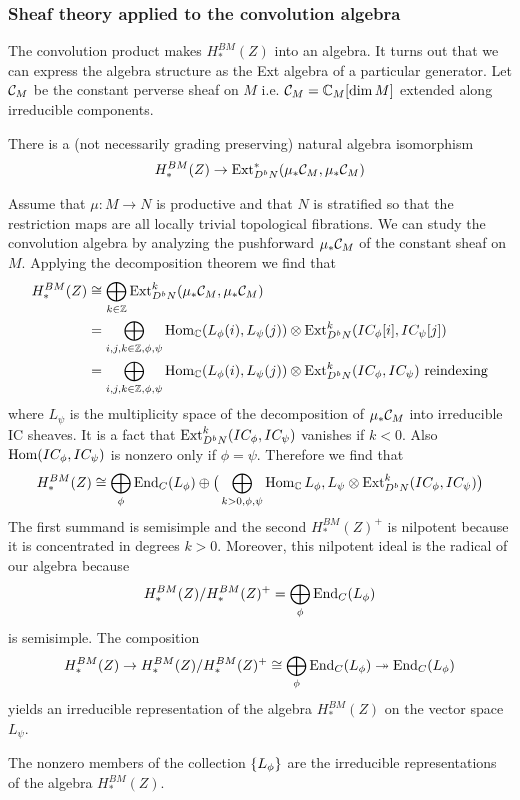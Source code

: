 \documentclass[12pt]{article}
\begin{document}
\subsubsection{Sheaf theory applied to the convolution algebra}
The convolution product makes $H^{BM}_*(Z)$ into an algebra.
It turns out that we can express the algebra structure as
the Ext algebra of a particular generator. Let ${\mathcal{C}}_M$ be the constant
perverse sheaf on $M$ i.e. ${\mathcal{C}}_M = \mathbb{C}_M[\dim M]$ extended along irreducible
components.

\begin{proposition}
    There is a (not necessarily grading preserving) natural algebra
    isomorphism \begin{align*}
        H^{BM}_*(Z) \to \operatorname{Ext}^*_{D^bN}(\mu_*{\mathcal{C}}_M,\mu_*{\mathcal{C}}_M)
    \end{align*}
\end{proposition}

Assume that $\mu:M\to N$ is productive and that $N$ is stratified
so that the restriction maps are all locally trivial topological fibrations.
We can study the convolution algebra by analyzing the pushforward
$\mu_*{\mathcal{C}}_M$ of the constant sheaf on $M$. Applying the
decomposition theorem we find that \begin{align*}
    H^{BM}_*(Z) & \cong \bigoplus_{k\in \mathbb{Z}} \operatorname{Ext}^k_{D^bN}(\mu_*{\mathcal{C}}_M,\mu_*{\mathcal{C}}_M)                                                           \\
                & = \bigoplus_{i,j,k\in\mathbb{Z},\phi,\psi} \operatorname{Hom}_{\mathbb{C}}(L_\phi(i),L_\psi(j))\otimes \operatorname{Ext}^k_{D^bN}(IC_\phi[i],IC_\psi[j])              \\
                & = \bigoplus_{i,j,k\in\mathbb{Z},\phi,\psi} \operatorname{Hom}_{\mathbb{C}}(L_\phi(i),L_\psi(j))\otimes \operatorname{Ext}^k_{D^bN}(IC_\phi,IC_\psi) \text{ reindexing}
\end{align*}
where $L_\psi$ is the multiplicity space of the decomposition of $\mu_*{\mathcal{C}}_M$ into irreducible
IC sheaves. It is a fact that $\operatorname{Ext}^k_{D^bN}(IC_\phi,IC_\psi)$ vanishes if $k<0$.
Also $\operatorname{Hom}(IC_\phi,IC_\psi)$ is nonzero only if $\phi = \psi$. Therefore
we find that \begin{align*}
    H^{BM}_*(Z) \cong \bigoplus_\phi \operatorname{End}_C(L_\phi) \oplus \big(\bigoplus_{k>0,\phi,\psi} \operatorname{Hom}_{\mathbb{C}}{L_\phi,L_\psi}\otimes
    \operatorname{Ext}^k_{D^bN}(IC_\phi,IC_\psi)\big)
\end{align*} The first summand is semisimple and the second $H^{BM}_*(Z)^+$ is nilpotent because
it is concentrated in degrees $k>0$. Moreover, this nilpotent ideal is the radical
of our algebra because
\begin{align*}
    H^{BM}_*(Z) / H^{BM}_*(Z)^+ = \bigoplus_\phi \operatorname{End}_C(L_\phi)
\end{align*} is semisimple. The composition \begin{align*}
    H^{BM}_*(Z) \to H^{BM}_*(Z) / H^{BM}_*(Z)^+ \cong \bigoplus_\phi \operatorname{End}_C(L_\phi) \twoheadrightarrow \operatorname{End}_C(L_\phi)
\end{align*} yields an irreducible representation of the algebra $H^{BM}_*(Z)$ on the vector space $L_\psi$.
\begin{theorem}
    The nonzero members of the collection $\{L_\phi\}$ are the
    irreducible representations of the algebra $H^{BM}_*(Z)$.
\end{theorem}
\end{document}

